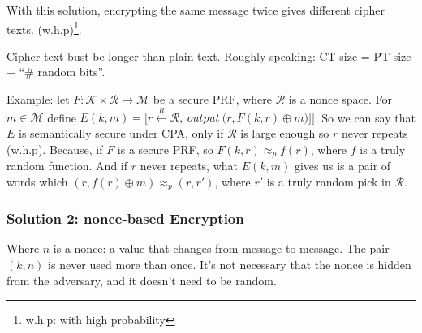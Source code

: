\documentclass[12pt]{book}
\begin{document}
With this solution, encrypting the same message twice gives different cipher texts. (w.h.p)\footnote{w.h.p: with high probability}. 

Cipher text bust be longer than plain text. Roughly speaking: CT-size = PT-size + ``\# random bits''.

Example: let $F:\mathcal{K}\times \mathcal{R}\rightarrow\mathcal{M}$ be a secure PRF, where $\mathcal{R}$ is a nonce space. For $m\in\mathcal{M}$ define $E(k,m)=\big[r\xleftarrow{R}\mathcal{R},\ output\ \big(r,F(k,r)\oplus m\big)\big]]$. So we can say that $E$ is semantically secure under CPA, only if $\mathcal{R}$ is large enough so $r$ never repeats (w.h.p). Because, if $F$ is a secure PRF, so $F(k,r)\approx_{p}f(r)$, where $f$ is a truly random function. And if $r$ never repeats, what $E(k,m)$ gives us is a pair of words which $(r,f(r)\oplus m)\approx_{p}(r,r')$, where $r'$ is a truly random pick in $\mathcal{R}$.

\subsubsection{Solution 2: nonce-based Encryption}
\begin{center}
\end{center}Where $n$ is a nonce: a value that changes from message to message. The pair $(k,n)$ is never used more than once. It's not necessary that the nonce is hidden from the adversary, and it doesn't need to be random.
\end{document}
